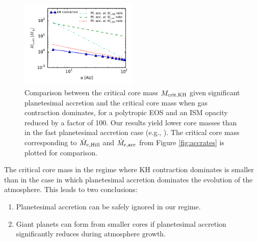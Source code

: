  \begin{figure}[htb]
\centering
\includegraphics[width=0.5\textwidth]{figures/Mc_vs_a_poly_comp.pdf}
\caption{Comparison between the critical core mass $M_{\rm{crit, KH}}$ given significant planetesimal accretion and the critical core mass when gas contraction dominates, for a polytropic EOS and an ISM opacity reduced by a factor of 100. Our results yield lower core masses than in the fast planetesimal accretion case (e.g., \citealt{rafikov06}). The critical core mass corresponding to $\dot{M}_{\rm c, Hill}$ and $\dot{M}_{\rm c, acc}$ from Figure \ref{fig:accrates} is plotted for comparison.}
\label{fig:raf2}
\end{figure}

The critical core mass in the regime where KH contraction dominates is smaller than in the case in which planetesimal accretion dominates the evolution of the atmosphere. This leads to two conclusions:

\begin{enumerate}
\item Planetesimal accretion can be safely ignored in our regime.
\item Giant planets can form from smaller cores if planetesimal accretion significantly reduces during atmosphere growth. 
\end{enumerate}





